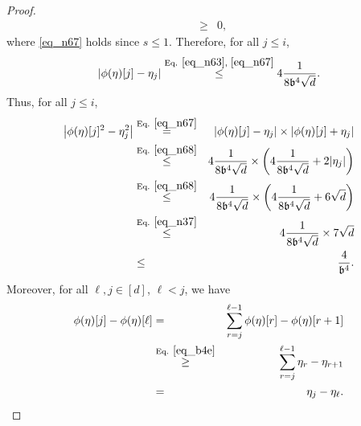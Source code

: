\documentclass[11pt,letterpaper]{article}
\begin{document}
\begin{proof}
\begin{eqnarray}
%
&\geq& 0 \label{eq_n67},
\end{eqnarray}
where \eqref{eq_n67} holds since $s \leq 1$.
%
Therefore, for all $j\leq i$,
%
\begin{equation}\label{eq_n64}
|\phi(\eta)[j] - \eta_j| \stackrel{\textrm{Eq. } \eqref{eq_n63}, \,\, \eqref{eq_n67}}{\leq} 4\frac{1}{8\mathfrak{b}^4\sqrt{d}}.
\end{equation}
%
Thus,  for all $j\leq i$,
%
\begin{eqnarray}\label{eq_n69}
\left |\phi(\eta)[j]^2 - \eta_j^2 \right | &\stackrel{\textrm{Eq. } \eqref{eq_n67}}{=}& \left |\phi(\eta)[j] - \eta_j \right | \times \left |\phi(\eta)[j] + \eta_j \right | \nonumber\\
%
 &\stackrel{\textrm{Eq. } \eqref{eq_n68}}{\leq}& 4\frac{1}{8\mathfrak{b}^4\sqrt{d}} \times \left(4\frac{1}{8\mathfrak{b}^4\sqrt{d}} + 2|\eta_j| \right) \nonumber\\
  &\stackrel{\textrm{Eq. } \eqref{eq_n68}}{\leq}& 4\frac{1}{8\mathfrak{b}^4\sqrt{d}} \times \left(4\frac{1}{8\mathfrak{b}^4\sqrt{d}} + 6\sqrt{d} \right) \nonumber\\
  &\stackrel{\textrm{Eq. } \eqref{eq_n37}}{\leq}&  4\frac{1}{8\mathfrak{b}^4\sqrt{d}} \times 7 \sqrt{d} \nonumber\\
  &\leq&  \frac{4}{\mathfrak{b}^4}.
%
\end{eqnarray}
Moreover, for all $\ell, j \in [d]$, $\ell <j$, we have
%
\begin{eqnarray}\label{eq_n60}
      \phi(\eta)[j] - \phi(\eta)[\ell] &=& \sum_{r = j}^{\ell-1}      \phi(\eta)[r] - \phi(\eta)[r+1]\nonumber\\
        &\stackrel{\textrm{Eq. } \eqref{eq_b4e}}{\geq}& \sum_{r = j}^{\ell-1}      \eta_r - \eta_{r+1}\nonumber\\
        &=& \eta_{j}- \eta_{\ell}.
      \end{eqnarray} 



\end{proof}
\end{document}
